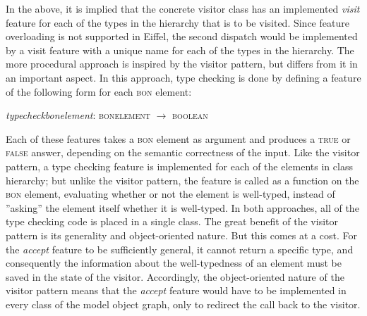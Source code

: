 In the above, it is implied that the concrete visitor class has an implemented \textit{visit} feature for each of the types in the hierarchy that is to be visited. Since feature overloading is not supported in Eiffel, the second dispatch would be implemented by a visit feature with a unique name for each of the types in the hierarchy.
The more procedural approach is inspired by the visitor pattern, but differs from it in an important aspect. In this approach, type checking is done by defining a feature of the following form for each \textsc{bon} element:
\begin{center}
\textit{type}\textunderscore\textit{check}\textunderscore\textit{bon}\textunderscore\textit{element}: \textsc{bon}\textunderscore\textsc{element} $\rightarrow$  \textsc{boolean}\\
\end{center}
Each of these features takes a \textsc{bon} element as argument and produces a \textsc{true} or \textsc{false} answer, depending on the semantic correctness of the input. Like the visitor pattern, a type checking feature is implemented for each of the elements in class hierarchy; but unlike the visitor pattern, the feature is called as a function on the \textsc{bon} element, evaluating whether or not the element is well-typed, instead of ''asking'' the element itself whether it is well-typed.
In both approaches, all of the type checking code is placed in a single class. The great benefit of the visitor pattern is its generality and object-oriented nature. But this comes at a cost. For the \textit{accept} feature to be sufficiently general, it cannot return a specific type, and consequently the information about the well-typedness of an element must be saved in the state of the visitor. Accordingly, the object-oriented nature of the visitor pattern means that the \textit{accept} feature would have to be implemented in every class of the model object graph, only to redirect the call back to the visitor.

